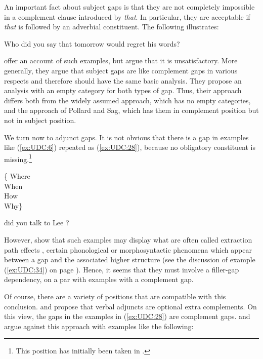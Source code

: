 \documentclass[output=paper
                ,modfonts
                ,nonflat
	        ,collection
	        ,collectionchapter
	        ,collectiontoclongg
 	        ,biblatex
                ,babelshorthands
                ,newtxmath
                ,draftmode
                ,colorlinks, citecolor=brown
]{./langsci/langscibook}
\begin{document}
{An important fact about subject gaps is that they are not completely
impossible in a complement clause introduced by \emph{that}. In
particular, they are acceptable if \emph{that} is followed by an
adverbial constituent. The following illustrates:

\begin{exe}
\ex \label{ex:UDC:27}
Who did you say that tomorrow \trace{} would regret his words?
\end{exe}

\noindent
\citet{Ginzburg:Sag:01} offer an account of such examples, but
\citet{Levine:Hukari:06} argue that it is unsatisfactory. More generally, they
argue that subject gaps are like complement gaps in various respects
and therefore should have the same basic analysis. They propose an
analysis with an empty category for both types of gap. Thus, their
approach differs both from the widely assumed approach, which has no
empty categories, and the approach of Pollard and Sag, which has them
in complement position but not in subject position.

We turn now to adjunct gaps. It is not obvious that there is a gap in
examples like (\ref{ex:UDC:6}) repeated as (\ref{ex:UDC:28}), because
no obligatory constituent is missing.\footnote{This position has initially
  been taken in \citet{Pollard:Sag:94}. } 

\begin{exe}
\ex \label{ex:UDC:28}
\begin{avm} 
  \{ \normalfont Where\\ \normalfont When\\ \normalfont How\\
  \normalfont Why\}
\end{avm}
did you talk to Lee \trace{}?
\end{exe}

\noindent
However, \cite{hukari.levine:adjunct} show that such examples may display
what are often called extraction path effects , certain phonological or
morphosyntactic phenomena which appear between a gap and the associated
higher structure (see the discussion of example (\ref{ex:UDC:34}) on
page \pageref{ex:UDC:34}). Hence, it seems that they must
involve a filler-gap dependency, on a par with examples with a
complement gap.

Of course, there are a variety of positions that are compatible with
this conclusion. \citet{Bouma:Malouf:Sag:01} and \citet[168,
fn.~2]{Ginzburg:Sag:01} propose that verbal adjuncts are optional
extra complements.  On this view, the gaps in the examples in
(\ref{ex:UDC:28}) are complement gaps.  \citet{Levine:03} and
\citet{Levine:Hukari:06} argue against this approach with examples
like the following:

}
\end{document}

